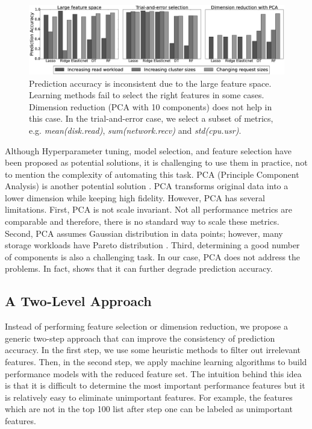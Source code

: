 \begin{figure}
    \centering
    \includegraphics[width=1\textwidth]{figures/challenge_generalization_combined_horizental.eps}
    \caption{Prediction accuracy is inconsistent due to the large feature space.
    Learning methods fail to select the right features in some cases.
    Dimension reduction (PCA with 10 components) does not help in this case.
    In the trial-and-error case, we select a subset of metrics, e.g. \emph{mean(disk.read)}, \emph{sum(network.recv)} and \emph{std(cpu.usr)}.}
    \label{fig:challenge_generalization}
\end{figure}

Although Hyperparameter tuning, model selection, and 
feature selection have been proposed as potential solutions, it is challenging 
to use them in practice, not to mention the complexity of automating this task. 
PCA (Principle Component Analysis) is another potential solution \cite{Shlens2003}.
PCA transforms original data into a lower dimension while keeping high fidelity.
However, PCA has several limitations. 
First, PCA is not scale invariant.
Not all performance metrics are comparable and therefore, there is no standard way to scale these metrics.
Second, PCA assumes Gaussian distribution in data points; however, many storage workloads have Pareto distribution \cite{Kim2010}.
Third, determining a good number of components is also a challenging task.
In our case, PCA does not address the problems.
In fact, \myfigure{\ref{fig:challenge_generalization}} shows that it can further degrade prediction accuracy.

\subsection{A Two-Level Approach}

Instead of performing feature selection or dimension reduction, we propose a generic two-step approach that can improve the consistency of prediction accuracy. 
In the first step, we use some heuristic methods to filter out irrelevant features.
Then, in the second step, we apply machine learning algorithms to build performance models with the reduced feature set.
The intuition behind this idea is that it is difficult to determine the most important performance features but it is relatively easy to eliminate unimportant features.
For example, the features which are not in the top 100 list after step one can be labeled as unimportant features.